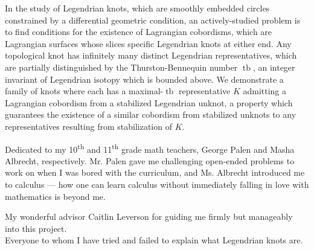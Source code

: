 \documentclass[11pt,twoside,reqno]{book}
\DeclareMathOperator{\tb}{tb}
\begin{document}

\abstr

In the study of Legendrian knots, which are smoothly embedded circles constrained by a differential geometric condition, an actively-studied problem is to find conditions for the existence of Lagrangian cobordisms, which are Lagrangian surfaces whose slices specific Legendrian knots at either end.
Any topological knot has infinitely many distinct Legendrian representatives, which are partially distinguished by the Thurston-Bennequin number $\tb$, an integer invariant of Legendrian isotopy which is bounded above.
We demonstrate a family of knots where each has a maximal-$\tb$ representative $K$ admitting a Lagrangian cobordism from a stabilized Legendrian unknot, a property which guarantees the existence of a similar cobordism from stabilized unknots to any representatives resulting from stabilization of $K$.

\dedic

Dedicated to my 10\textsuperscript{th} and 11\textsuperscript{th} grade math teachers, George Palen and Masha Albrecht, respectively. Mr. Palen gave me challenging open-ended problems to work on when I was bored with the curriculum, and Ms. Albrecht introduced me to calculus --- how one can learn calculus without immediately falling in love with mathematics is beyond me. 

\acknowl

My wonderful advisor Caitlin Leverson for guiding me firmly but manageably into this project.\\
Everyone to whom I have tried and failed to explain what Legendrian knots are.

\tableofcontents

\startmain









\begin{appendices}

    

\end{appendices}

\printbibliography[heading=bibintoc]
\end{document}
